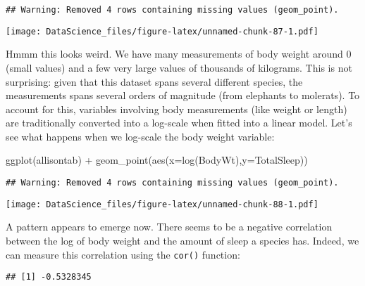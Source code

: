 \documentclass[
]{book}
\newenvironment{Shaded}{\begin{snugshade}}{\end{snugshade}}
\newcommand{\AttributeTok}[1]{\textcolor[rgb]{0.77,0.63,0.00}{#1}}
\newcommand{\FunctionTok}[1]{\textcolor[rgb]{0.00,0.00,0.00}{#1}}
\newcommand{\NormalTok}[1]{#1}
\newcommand{\SpecialCharTok}[1]{\textcolor[rgb]{0.00,0.00,0.00}{#1}}
\newcommand{\StringTok}[1]{\textcolor[rgb]{0.31,0.60,0.02}{#1}}
\begin{document}
\begin{verbatim}
## Warning: Removed 4 rows containing missing values (geom_point).
\end{verbatim}

\texttt{[image: DataScience\_files/figure-latex/unnamed-chunk-87-1.pdf]}

Hmmm this looks weird. We have many measurements of body weight around 0 (small values) and a few very large values of thousands of kilograms. This is not surprising: given that this dataset spans several different species, the measurements spans several orders of magnitude (from elephants to molerats). To account for this, variables involving body measurements (like weight or length) are traditionally converted into a log-scale when fitted into a linear model. Let's see what happens when we log-scale the body weight variable:

\begin{Shaded}
\begin{Highlighting}[]
\FunctionTok{ggplot}\NormalTok{(allisontab) }\SpecialCharTok{+} \FunctionTok{geom\_point}\NormalTok{(}\FunctionTok{aes}\NormalTok{(}\AttributeTok{x=}\FunctionTok{log}\NormalTok{(BodyWt),}\AttributeTok{y=}\NormalTok{TotalSleep))}
\end{Highlighting}
\end{Shaded}

\begin{verbatim}
## Warning: Removed 4 rows containing missing values (geom_point).
\end{verbatim}

\texttt{[image: DataScience\_files/figure-latex/unnamed-chunk-88-1.pdf]}

A pattern appears to emerge now. There seems to be a negative correlation between the log of body weight and the amount of sleep a species has. Indeed, we can measure this correlation using the \texttt{cor()} function:

\begin{Shaded}
\end{Shaded}

\begin{verbatim}
## [1] -0.5328345
\end{verbatim}
\end{document}
